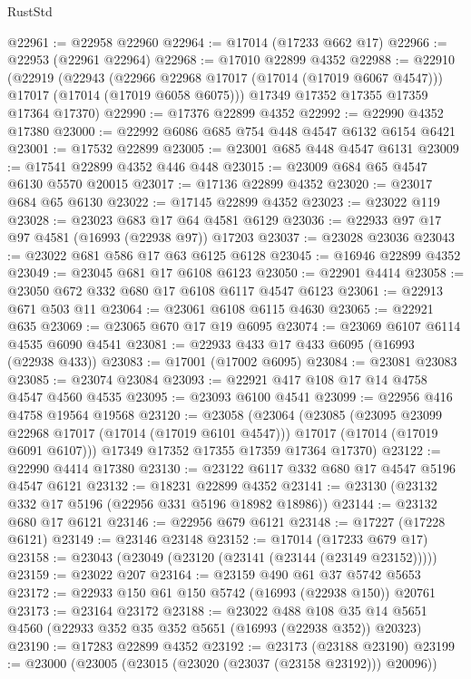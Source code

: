 \begin{lexlean}{RustStd}
\begin{coremodule}
@22961 := @22958 @22960
@22964 := @17014 (@17233 @662 @17)
@22966 := @22953 (@22961 @22964)
@22968 := @17010 @22899 @4352
@22988 := @22910
    (@22919
      (@22943
        (@22966 @22968 @17017 (@17014 (@17019 @6067 @4547)))
        @17017
        (@17014 (@17019 @6058 @6075)))
      @17349
      @17352
      @17355
      @17359
      @17364
      @17370)
@22990 := @17376 @22899 @4352
@22992 := @22990 @4352 @17380
@23000 := @22992 @6086 @685 @754 @448 @4547 @6132 @6154 @6421
@23001 := @17532 @22899
@23005 := @23001 @685 @448 @4547 @6131
@23009 := @17541 @22899 @4352 @446 @448
@23015 := @23009 @684 @65 @4547 @6130 @5570 @20015
@23017 := @17136 @22899 @4352
@23020 := @23017 @684 @65 @6130
@23022 := @17145 @22899 @4352
@23023 := @23022 @119
@23028 := @23023 @683 @17 @64 @4581 @6129
@23036 := @22933 @97 @17 @97 @4581 (@16993 (@22938 @97)) @17203
@23037 := @23028 @23036
@23043 := @23022 @681 @586 @17 @63 @6125 @6128
@23045 := @16946 @22899 @4352
@23049 := @23045 @681 @17 @6108 @6123
@23050 := @22901 @4414
@23058 := @23050 @672 @332 @680 @17 @6108 @6117 @4547 @6123
@23061 := @22913 @671 @503 @11
@23064 := @23061 @6108 @6115 @4630
@23065 := @22921 @635
@23069 := @23065 @670 @17 @19 @6095
@23074 := @23069 @6107 @6114 @4535 @6090 @4541
@23081 := @22933 @433 @17 @433 @6095 (@16993 (@22938 @433))
@23083 := @17001 (@17002 @6095)
@23084 := @23081 @23083
@23085 := @23074 @23084
@23093 := @22921 @417 @108 @17 @14 @4758 @4547 @4560 @4535
@23095 := @23093 @6100 @4541
@23099 := @22956 @416 @4758 @19564 @19568
@23120 := @23058
    (@23064
      (@23085
        (@23095 @23099 @22968 @17017 (@17014 (@17019 @6101 @4547)))
        @17017
        (@17014 (@17019 @6091 @6107)))
      @17349
      @17352
      @17355
      @17359
      @17364
      @17370)
@23122 := @22990 @4414 @17380
@23130 := @23122 @6117 @332 @680 @17 @4547 @5196 @4547 @6121
@23132 := @18231 @22899 @4352
@23141 := @23130 (@23132 @332 @17 @5196 (@22956 @331 @5196 @18982 @18986))
@23144 := @23132 @680 @17 @6121
@23146 := @22956 @679 @6121
@23148 := @17227 (@17228 @6121)
@23149 := @23146 @23148
@23152 := @17014 (@17233 @679 @17)
@23158 := @23043 (@23049 (@23120 (@23141 (@23144 (@23149 @23152)))))
@23159 := @23022 @207
@23164 := @23159 @490 @61 @37 @5742 @5653
@23172 := @22933 @150 @61 @150 @5742 (@16993 (@22938 @150)) @20761
@23173 := @23164 @23172
@23188 := @23022
    @488
    @108
    @35
    @14
    @5651
    @4560
    (@22933 @352 @35 @352 @5651 (@16993 (@22938 @352)) @20323)
@23190 := @17283 @22899 @4352
@23192 := @23173 (@23188 @23190)
@23199 := @23000 (@23005 (@23015 (@23020 (@23037 (@23158 @23192))) @20096))

\end{coremodule}
\end{lexlean}
